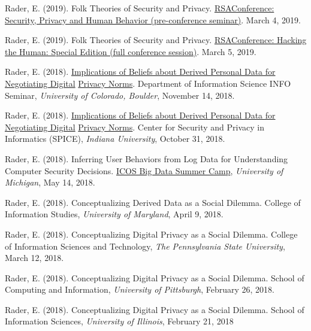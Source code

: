 \documentclass[9pt]{extarticle}
\begin{document}
Rader, E. (2019). Folk Theories of Security and Privacy. \href{https://www.rsaconference.com/industry-topics/presentation/security-privacy-and-human-behavior}{RSAConference: Security, Privacy and Human Behavior (pre-conference seminar)}. March 4, 2019.

Rader, E. (2019). Folk Theories of Security and Privacy. \href{https://www.rsaconference.com/industry-topics/presentation/security-privacy-and-human-behavior}{RSAConference: Hacking the Human: Special Edition (full conference session)}. March 5, 2019.

Rader, E. (2018). \href{https://calendar.colorado.edu/event/info_seminar_emilee_rader_implications_of_beliefs_about_derived_personal_data}{Implications of Beliefs about Derived Personal Data for Negotiating Digital} \href{https://calendar.colorado.edu/event/info_seminar_emilee_rader_implications_of_beliefs_about_derived_personal_data}{Privacy Norms}. Department of Information Science INFO Seminar, \emph{University of Colorado, Boulder}, November 14, 2018.

Rader, E. (2018). \href{https://spice.sice.indiana.edu/2018/11/02/spice-talk-series-features-professor-emilee-rader}{Implications of Beliefs about Derived Personal Data for Negotiating Digital} \href{https://spice.sice.indiana.edu/2018/11/02/spice-talk-series-features-professor-emilee-rader}{Privacy Norms}. Center for Security and Privacy in Informatics (SPICE), \emph{Indiana University}, October 31, 2018.

Rader, E. (2018). Inferring User Behaviors from Log Data for Understanding Computer Security Decisions. \href{https://icosbigdatacamp.github.io/2018-summer-camp/}{ICOS Big Data Summer Camp}, \emph{University of Michigan}, May 14, 2018.  

Rader, E. (2018). Conceptualizing Derived Data as a Social Dilemma. College of Information Studies, \emph{University of Maryland}, April 9, 2018.

Rader, E. (2018). Conceptualizing Digital Privacy as a Social Dilemma. College of Information Sciences and Technology, \emph{The Pennsylvania State University}, March 12, 2018.

Rader, E. (2018). Conceptualizing Digital Privacy as a Social Dilemma. School of Computing and Information, \emph{University of Pittsburgh}, February 26, 2018.

Rader, E. (2018). Conceptualizing Digital Privacy as a Social Dilemma. School of Information Sciences, \emph{University of Illinois}, February 21, 2018
\end{document}
